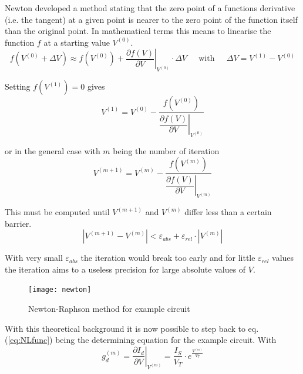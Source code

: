Newton developed a method stating that the zero point of a functions
derivative (i.e. the tangent) at a given point is nearer to the zero
point of the function itself than the original point.  In mathematical
terms this means to linearise the function $f$ at a starting value
$V^{(0)}$.
\begin{equation}
f\left(V^{(0)} + \Delta V\right) \approx f\left(V^{(0)}\right) + \left.\dfrac{\partial f\left(V\right)}{\partial V}\right|_{V^{(0)}}\cdot \Delta V
\;\;\;\; \text{ with } \;\;\;\;
\Delta V = V^{(1)} - V^{(0)}
\label{eq:NRapprox}
\end{equation}

Setting $f(V^{(1)}) = 0$ gives
\begin{equation}
V^{(1)} = V^{(0)} - \dfrac{f\left(V^{(0)}\right)}{\left.\dfrac{\partial f\left(V\right)}{\partial V}\right|_{V^{(0)}}}
\end{equation}

or in the general case with $m$ being the number of iteration
\begin{equation}
V^{(m + 1)} = V^{(m)} - \dfrac{f\left(V^{(m)}\right)}{\left.\dfrac{\partial f\left(V\right)}{\partial V}\right|_{V^{(m)}}}
\label{eq:NRgeneral}
\end{equation}

This must be computed until $V^{(m+1)}$ and $V^{(m)}$ differ less than a
certain barrier.
\begin{equation}
\left|V^{(m+1)} - V^{(m)}\right| < \varepsilon_{abs} + \varepsilon_{rel}\cdot \left|V^{(m)}\right|
\label{eq:NLconvergence}
\end{equation}

With very small $\varepsilon_{abs}$ the iteration would break too
early and for little $\varepsilon_{rel}$ values the iteration aims to
a useless precision for large absolute values of $V$.

\begin{figure}[ht]
\begin{center}
\texttt{[image: newton]}
\end{center}
\caption{Newton-Raphson method for example circuit}
\label{fig:NewtonRaphson}
\end{figure}
\FloatBarrier

With this theoretical background it is now possible to step back to
eq. (\ref{eq:NLfunc}) being the determining equation for the example
circuit.  With
\begin{equation}
g_{d}^{(m)} = \left.\dfrac{\partial I_{d}}{\partial V}\right|_{V^{(m)}} = \dfrac{I_{S}}{V_{T}}\cdot e^{\frac{V^{(m)}}{V_{T}}}
\end{equation}

